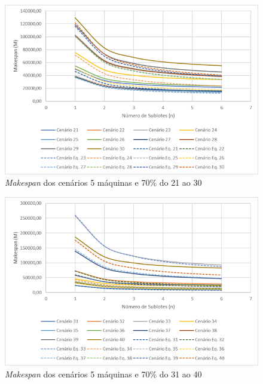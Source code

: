 \begin{figure}[H]
    \centering
    \includegraphics[width=13cm]{Apendices/Figuras/05m70_21-30}
    \caption{\textit{Makespan} dos cenários 5 máquinas e 70\% do 21 ao 30}
    \label{fig:05m70_21-30}
\end{figure}

\begin{figure}[H]
    \centering
    \includegraphics[width=13cm]{Apendices/Figuras/05m70_31-40}
    \caption{\textit{Makespan} dos cenários 5 máquinas e 70\% do 31 ao 40}
    \label{fig:05m70_31-40}
\end{figure}

